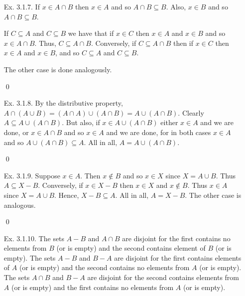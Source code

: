 \begin{enumerate}[Ex. 3.1.1.]
\begin{enumerate}[(a)]
        Similarly, clearly $\varnothing \subseteq A\cap(X-A)$, and we need only show $A\cap(X-A)$ is
        empty. If $x\in A\cap(X - A)$ then $x\in A$ and $x\not\in A$, which is impossible.

        \item We show the first law. The second one is analogous. If $x\in X - (A\cup B)$ then
        $x\in X$ and $x$ is neither in $A$ nor in $B$. Thus $x\in X-A$ and $x\in X-B$. Thus
        $x\in (X-A)\cap(X-B)$. Conversely, if $x\in (X-A) \cap (X-B)$ we have $x\in X$ regardless,
        but also $x\not\in A$ and $x\not\in B$, and so $x\in X-(A\cup B)$.
    \end{enumerate}

    \qed

    \item[Ex. 3.1.7.] If $x\in A\cap B$ then $x\in A$ and so $A\cap B\subseteq B$. Also, $x\in B$ and so
    $A\cap B \subseteq B$.

    If $C\subseteq A$ and $C\subseteq B$ we have that if $x\in C$ then $x\in A$ and $x\in B$ and
    so $x\in A\cap B$. Thus, $C\subseteq A\cap B$. Conversely, if $C\subseteq A\cap B$ then if $x\in C$
    then $x\in A$ and $x\in B$, and so $C\subseteq A$ and $C\subseteq B$.

    The other case is done analogously.

    \qed

    \item[Ex. 3.1.8.] By the distributive property, $A\cap(A\cup B) = (A\cap A) \cup (A\cap B) = A\cup (A\cap B)$.
    Clearly $A\subseteq A\cup (A\cap B)$. But also, if $x\in A\cup (A\cap B)$ either $x\in A$ and we
    are done, or $x\in A\cap B$ and so $x\in A$ and we are done, for in both cases $x\in A$ and so
    $A\cup (A\cap B) \subseteq A$. All in all, $A = A\cup (A\cap B)$.

    \qed

    \item[Ex. 3.1.9.] Suppose $x \in A$. Then $x\not\in B$ and so $x\in X$ since $X = A\cup B$. Thus
    $A\subseteq X - B$. Conversely, if $x\in X - B$ then $x\in X$ and $x\not\in B$. Thus
    $x\in A$ since $X = A\cup B$. Hence, $X- B\subseteq A$. All in all, $A = X - B$. The
    other case is analogous.

    \qed

    \item[Ex. 3.1.10.] The sets $A-B$ and $A\cap B$ are disjoint for the first
    contains no elements from $B$ (or is empty) and the second contains element 
    of $B$ (or is empty). The sets $A -B$ and $B -A$ are disjoint for the first 
    contains elements of $A$ (or is empty) and the second contains no elements from
    $A$ (or is empty). The sets $A\cap B$ and $B - A$ are disjoint for the second contains elements
    from $A$ (or is empty) and the first contains no elements from $A$ (or is empty).


\end{enumerate}
